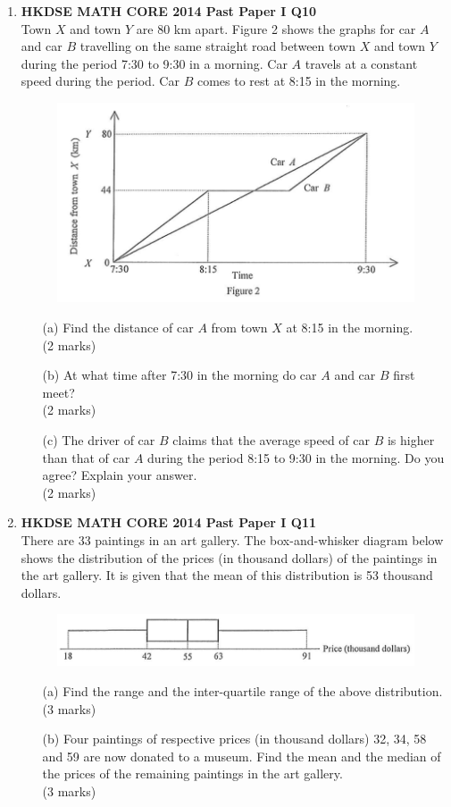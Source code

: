 \documentclass[12pt]{article}
\begin{document}
\begin{enumerate}
	\item \textbf{HKDSE MATH CORE 2014 Past Paper I Q10}\\
	Town $X$ and town $Y$ are 80 km apart. Figure 2 shows the graphs for car $A$ and car $B$ travelling on the same straight road between town $X$ and town $Y$ during the period 7:30 to 9:30 in a morning. Car $A$ travels at a constant speed during the period. Car $B$ comes to rest at 8:15 in the morning.
	\begin{figure}[H]
		\centering
		\includegraphics[width = .3\linewidth]{2014Figure1.2}
	\end{figure}
	\begin{enumerate}
		\item[(a)] Find the distance of car $A$ from town $X$ at 8:15 in the morning. \\(2 marks)
		\item[(b)] At what time after 7:30 in the morning do car $A$ and car $B$ first meet? \\(2 marks)
		\item[(c)] The driver of car $B$ claims that the average speed of car $B$ is higher than that of car $A$ during the period 8:15 to 9:30 in the morning. Do you agree? Explain your answer. \\(2 marks)
	\end{enumerate}

	\item \textbf{HKDSE MATH CORE 2014 Past Paper I Q11}\\
	There are 33 paintings in an art gallery. The box-and-whisker diagram below shows the distribution of the prices (in thousand dollars) of the paintings in the art gallery. It is given that the mean of this distribution is 53 thousand dollars.
	\begin{figure}[H]
		\centering
		\includegraphics[width = .3\linewidth]{2014Figure1.00}
	\end{figure}
	\begin{enumerate}
		\item[(a)] Find the range and the inter-quartile range of the above distribution. \\(3 marks)
		\item[(b)] Four paintings of respective prices (in thousand dollars) 32, 34, 58 and 59 are now donated to a museum. Find the mean and the median of the prices of the remaining paintings in the art gallery. \\(3 marks)
	\end{enumerate}


\end{enumerate}
\end{document}

